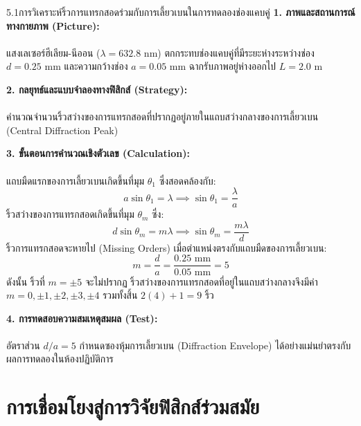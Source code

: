 \begin{psctexample}{5.1}{การวิเคราะห์ริ้วการแทรกสอดร่วมกับการเลี้ยวเบนในการทดลองช่องแคบคู่}
\textbf{1. ภาพและสถานการณ์ทางกายภาพ (Picture):}\\\\ แสงเลเซอร์ฮีเลียม-นีออน ($\lambda = 632.8\text{ nm}$) ตกกระทบช่องแคบคู่ที่มีระยะห่างระหว่างช่อง $d = 0.25\text{ mm}$ และความกว้างช่อง $a = 0.05\text{ mm}$ ฉากรับภาพอยู่ห่างออกไป $L = 2.0\text{ m}$

\vspace{4pt}
\textbf{2. กลยุทธ์และแบบจำลองทางฟิสิกส์ (Strategy):}\\\\ คำนวณจำนวนริ้วสว่างของการแทรกสอดที่ปรากฏอยู่ภายในแถบสว่างกลางของการเลี้ยวเบน (Central Diffraction Peak)

\vspace{4pt}
\textbf{3. ขั้นตอนการคำนวณเชิงตัวเลข (Calculation):}\\\\ แถบมืดแรกของการเลี้ยวเบนเกิดขึ้นที่มุม $\theta_1$ ซึ่งสอดคล้องกับ:
\begin{equation}
a \sin\theta_1 = \lambda \implies \sin\theta_1 = \frac{\lambda}{a}
\end{equation}
ริ้วสว่างของการแทรกสอดเกิดขึ้นที่มุม $\theta_m$ ซึ่ง:
\begin{equation}
d \sin\theta_m = m\lambda \implies \sin\theta_m = \frac{m\lambda}{d}
\end{equation}
ริ้วการแทรกสอดจะหายไป (Missing Orders) เมื่อตำแหน่งตรงกับแถบมืดของการเลี้ยวเบน:
\begin{equation}
m = \frac{d}{a} = \frac{0.25\text{ mm}}{0.05\text{ mm}} = 5
\end{equation}
ดังนั้น ริ้วที่ $m = \pm 5$ จะไม่ปรากฏ ริ้วสว่างของการแทรกสอดที่อยู่ในแถบสว่างกลางจึงมีค่า $m = 0, \pm 1, \pm 2, \pm 3, \pm 4$ รวมทั้งสิ้น $2(4) + 1 = 9$ ริ้ว

\vspace{4pt}
\textbf{4. การทดสอบความสมเหตุสมผล (Test):}\\\\ อัตราส่วน $d/a = 5$ กำหนดซองหุ้มการเลี้ยวเบน (Diffraction Envelope) ได้อย่างแม่นยำตรงกับผลการทดลองในห้องปฏิบัติการ
\end{psctexample}

\section{การเชื่อมโยงสู่การวิจัยฟิสิกส์ร่วมสมัย}

